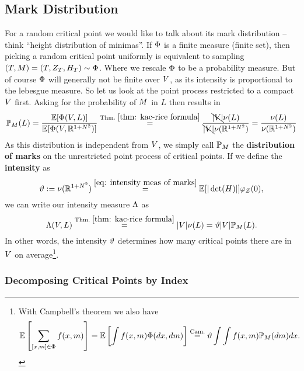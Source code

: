 \subsection{Mark Distribution}

For a random critical point we would like to talk about its mark
distribution -- think ``height distribution of minimas''. If \(\Phi\) is a finite measure (finite set), then picking a random
critical point uniformly is equivalent to sampling
\((T,M)=(T,Z_T,H_T)\sim\Phi\).  Where we rescale \(\Phi\) to be a
probability measure. But of course \(\Phi\) will generally not be finite over
\(V\), as its intensity is proportional to the lebesgue measure. So let us
look at the point process restricted to a compact \(V\) first. Asking for the
probability of \(M\) in \(L\) then results in
\[
	\mathbb{P}_M(L)
	=\frac{\mathbb{E}[\Phi(V, L)]}{\mathbb{E}[\Phi(V, \mathbb{R}^{1+N^2})]}
	\overset{\text{Thm.~}\ref{thm: kac-rice formula}}=
	\frac{\bcancel{|V|}\nu(L)}{\bcancel{|V|}\nu(\mathbb{R}^{1+N^2})}
	= \frac{\nu(L)}{\nu(\mathbb{R}^{1+N^2})}
\]
As this distribution is independent from \(V\), we simply call
\(\mathbb{P}_M\) the \textbf{distribution of marks} on the unrestricted point
process of critical points.  If we define the
\textbf{intensity} as
\[
	\vartheta
	:= \nu(\mathbb{R}^{1+N^2})
	\overset{\eqref{eq: intensity meas of marks}}=
	\mathbb{E}[|\det(H)|]\varphi_Z(0),
\]
we can write our intensity measure \(\Lambda\) as
\[
	\Lambda(V, L) 
	\overset{\text{Thm.~}\ref{thm: kac-rice formula}}=
	|V|\nu(L)
	= \vartheta |V| \mathbb{P}_M(L).
\]
In other words, the intensity \(\vartheta\) determines how many critical points
there are in \(V\) on average\footnote{
	With Campbell's theorem we also have
	\[
		\mathbb{E}\left[\sum_{[x,m]\in\Phi} f(x,m)\right]
		=\mathbb{E}\left[\int f(x,m) \Phi(dx,dm)\right]
		\overset{\text{Cam.}}= \vartheta \int \int f(x,m) \mathbb{P}_M(dm) dx.
	\]
}.

\subsubsection{Decomposing Critical Points by Index}


